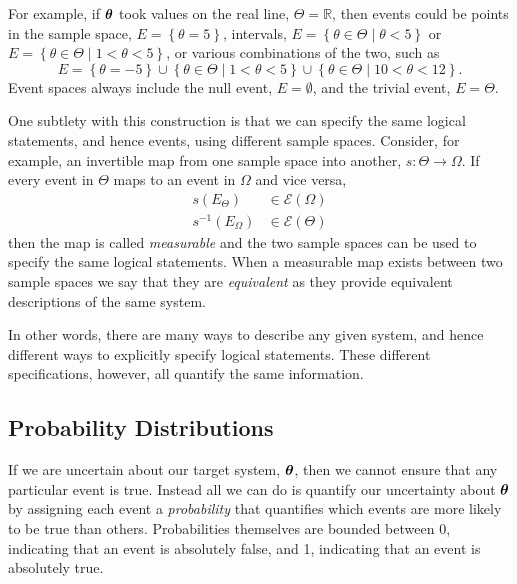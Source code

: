 \documentclass[11pt, oneside]{article}
\newcommand{\RR}{ \mathbb{R} }
\newcommand{\EV}[1]{\ensuremath { \mathcal{E} \! \left( #1 \right)  } }
\newcommand{\bt}{ \mbox{\boldmath{$\theta$}} }
\begin{document}
For example, if $\bt$ took values on the real line, $\Theta = \RR$, then 
events could be points in the sample space, $E = \left\{ \theta = 5 \right\}$, 
intervals, $E = \left\{ \theta \in \Theta \mid \theta < 5 \right\}$ or 
$E = \left\{ \theta \in \Theta \mid 1 < \theta < 5 \right\}$, or various
combinations of the two, such as
%
\begin{equation*}
E = 
\left\{ \theta = -5 \right\}
\cup
\left\{ \theta \in \Theta \mid 1 < \theta < 5 \right\}
\cup
\left\{ \theta \in \Theta \mid 10 < \theta < 12 \right\}.
\end{equation*}
%
Event spaces always include the null event, $E = \emptyset$, and the 
trivial event, $E = \Theta$.

One subtlety with this construction is that we can specify the
same logical statements, and hence events, using different 
sample spaces.  Consider, for example, an invertible map 
from one sample space into another, $s : \Theta \rightarrow \Omega$.  
If every event in $\Theta$ maps to an event in $\Omega$
and vice versa,
%
\begin{align*}
s \! \left( E_{\Theta} \right) &\in \EV{\Omega}
\\
s^{-1} \! \left( E_{\Omega} \right) &\in \EV{\Theta}
\end{align*}
%
then the map is called \emph{measurable} and the two
sample spaces can be used to specify the same logical 
statements.  When a measurable map exists between
two sample spaces we say that they are \emph{equivalent}
as they provide equivalent descriptions of the same system.

In other words, there are many ways to describe any given system,
and hence different ways to explicitly specify logical statements.
These different specifications, however, all quantify the same 
information.

\subsection{Probability Distributions}

If we are uncertain about our target system, $\bt$, then we cannot
ensure that any particular event is true.  Instead all we can do
is quantify our uncertainty about $\bt$ by assigning each event a
\emph{probability} that quantifies which events are more likely to
be true than others.  Probabilities themselves are bounded between 
0, indicating that an event is absolutely false, and 1, indicating that 
an event is absolutely true.
\end{document}
